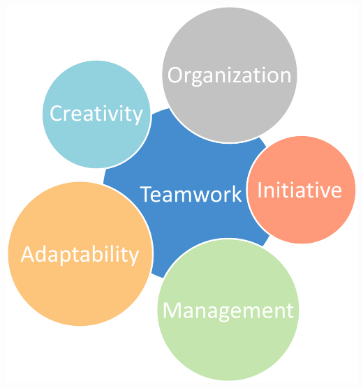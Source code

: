 \documentclass[]{friggeri-cv}
\begin{document}
\begin{aside}
\includegraphics[scale=0.40]{res/img/profileMap_EN.png}\vspace{2.5mm}

\end{aside}
\end{document}
